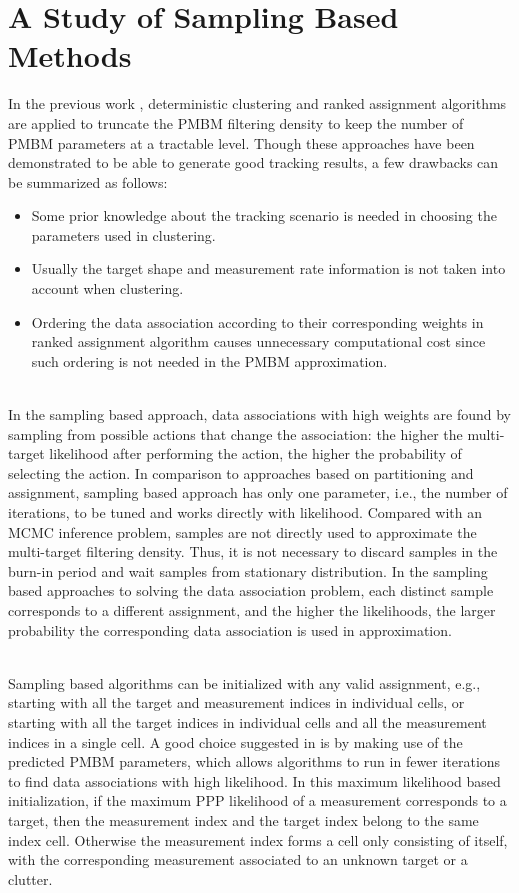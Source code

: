 \chapter{A Study of Sampling Based Methods}
In the previous work \cite{pmbmextended,pmbmextended2}, deterministic clustering and ranked assignment algorithms are applied to truncate the PMBM filtering density to keep the number of PMBM parameters at a tractable level. Though these approaches have been demonstrated to be able to generate good tracking results, a few drawbacks can be summarized as follows:
\begin{itemize}
    \item Some prior knowledge about the tracking scenario is needed in choosing the parameters used in clustering. 
    \item Usually the target shape and measurement rate information is not taken into account when clustering. 
    \item Ordering the data association according to their corresponding weights in ranked assignment algorithm causes unnecessary computational cost since such ordering is not needed in the PMBM approximation. 
\end{itemize}

~\\
In the sampling based approach, data associations with high weights are found by sampling from possible actions that change the association: the higher the multi-target likelihood after performing the action, the higher the probability of selecting the action. In comparison to approaches based on partitioning and assignment, sampling based approach has only one parameter, i.e., the number of iterations, to be tuned and works directly with likelihood. Compared with an MCMC inference problem, samples are not directly used to approximate the multi-target filtering density. Thus, it is not necessary to discard samples in the burn-in period and wait samples from stationary distribution. In the sampling based approaches to solving the data association problem, each distinct sample corresponds to a different assignment, and the higher the likelihoods, the larger probability the corresponding data association is used in approximation. 

~\\
Sampling based algorithms can be initialized with any valid assignment, e.g., starting with all the target and measurement indices in individual cells, or starting with all the target indices in individual cells and all the measurement indices in a single cell. A good choice suggested in \cite{soextended} is by making use of the predicted PMBM parameters, which allows algorithms to run in fewer iterations to find data associations with high likelihood. In this maximum likelihood based initialization, if the maximum PPP likelihood of a measurement corresponds to a target, then the measurement index and the target index belong to the same index cell. Otherwise the measurement index forms a cell only consisting of itself, with the corresponding measurement associated to an unknown target or a clutter.

